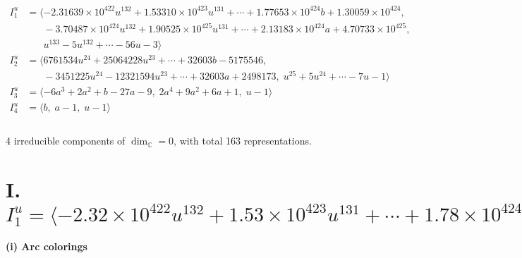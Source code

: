 \documentclass[1p]{elsarticle_modified}
\theoremstyle{definition}
\begin{document}
\begin{align*}
I^u_{1}&=\langle 
-2.31639\times10^{422} u^{132}+1.53310\times10^{423} u^{131}+\cdots+1.77653\times10^{424} b+1.30059\times10^{424},\\
\phantom{I^u_{1}}&\phantom{= \langle  }-3.70487\times10^{424} u^{132}+1.90525\times10^{425} u^{131}+\cdots+2.13183\times10^{424} a+4.70733\times10^{425},\\
\phantom{I^u_{1}}&\phantom{= \langle  }u^{133}-5 u^{132}+\cdots-56 u-3\rangle \\
I^u_{2}&=\langle 
6761534 u^{24}+25064228 u^{23}+\cdots+32603 b-5175546,\\
\phantom{I^u_{2}}&\phantom{= \langle  }-3451225 u^{24}-12321594 u^{23}+\cdots+32603 a+2498173,\;u^{25}+5 u^{24}+\cdots-7 u-1\rangle \\
I^u_{3}&=\langle 
-6 a^3+2 a^2+b-27 a-9,\;2 a^4+9 a^2+6 a+1,\;u-1\rangle \\
I^u_{4}&=\langle 
b,\;a-1,\;u-1\rangle \\
\\
\end{align*}
\raggedright * 4 irreducible components of $\dim_{\mathbb{C}}=0$, with total 163 representations.\\
\newpage
\renewcommand{\arraystretch}{1}
\centering \section*{I. $I^u_{1}= \langle -2.32\times10^{422} u^{132}+1.53\times10^{423} u^{131}+\cdots+1.78\times10^{424} b+1.30\times10^{424},\;-3.70\times10^{424} u^{132}+1.91\times10^{425} u^{131}+\cdots+2.13\times10^{424} a+4.71\times10^{425},\;u^{133}-5 u^{132}+\cdots-56 u-3 \rangle$}
\flushleft \textbf{(i) Arc colorings}\\
\end{document}
